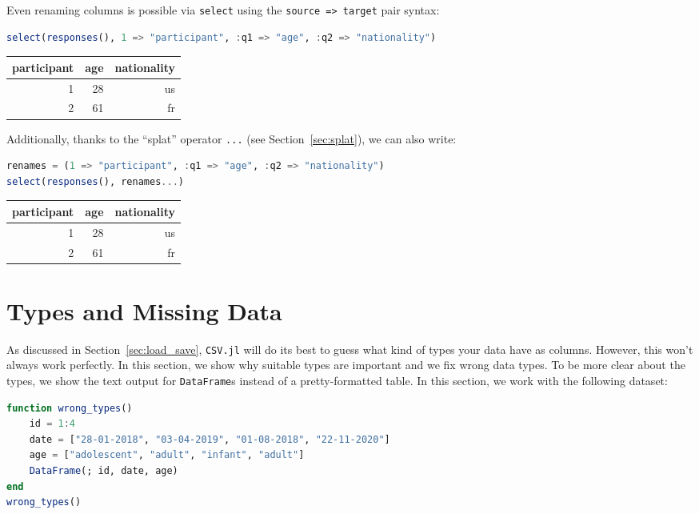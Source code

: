 \documentclass[
  notoc %
]{tufte-book}
\newcommand{\passthrough}[1]{#1}
\begin{document}
Even renaming columns is possible via \passthrough{\lstinline!select!}
using the \passthrough{\lstinline!source => target!} pair syntax:

\begin{lstlisting}[language=Julia]
select(responses(), 1 => "participant", :q1 => "age", :q2 => "nationality")
\end{lstlisting}

\begin{longtable}[]{@{}rrr@{}}
\toprule
participant & age & nationality \\
\midrule
\endhead
1 & 28 & us \\
2 & 61 & fr \\
\bottomrule
\end{longtable}

Additionally, thanks to the ``splat'' operator
\passthrough{\lstinline!...!} (see Section~\ref{sec:splat}), we can also
write:

\begin{lstlisting}[language=Julia]
renames = (1 => "participant", :q1 => "age", :q2 => "nationality")
select(responses(), renames...)
\end{lstlisting}

\begin{longtable}[]{@{}rrr@{}}
\toprule
participant & age & nationality \\
\midrule
\endhead
1 & 28 & us \\
2 & 61 & fr \\
\bottomrule
\end{longtable}

\hypertarget{sec:missing_data}{%
\section{Types and Missing Data}\label{sec:missing_data}}

As discussed in Section~\ref{sec:load_save},
\passthrough{\lstinline!CSV.jl!} will do its best to guess what kind of
types your data have as columns. However, this won't always work
perfectly. In this section, we show why suitable types are important and
we fix wrong data types. To be more clear about the types, we show the
text output for \passthrough{\lstinline!DataFrame!}s instead of a
pretty-formatted table. In this section, we work with the following
dataset:

\begin{lstlisting}[language=Julia]
function wrong_types()
    id = 1:4
    date = ["28-01-2018", "03-04-2019", "01-08-2018", "22-11-2020"]
    age = ["adolescent", "adult", "infant", "adult"]
    DataFrame(; id, date, age)
end
wrong_types()
\end{lstlisting}
\end{document}
